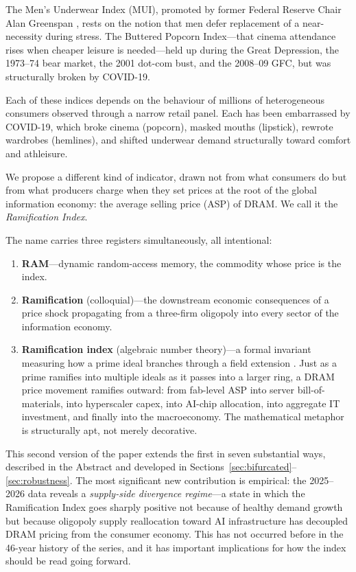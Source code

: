 \documentclass[12pt]{article}
\theoremstyle{definition}
\begin{document}
The Men's Underwear Index (MUI), promoted by former Federal Reserve Chair Alan Greenspan \cite{Greenspan2007,Krulwich2008}, rests on the notion that men defer replacement of a near-necessity during stress. The Buttered Popcorn Index---that cinema attendance rises when cheaper leisure is needed---held up during the Great Depression, the 1973--74 bear market, the 2001 dot-com bust, and the 2008--09 GFC, but was structurally broken by COVID-19.

Each of these indices depends on the behaviour of millions of heterogeneous consumers observed through a narrow retail panel. Each has been embarrassed by COVID-19, which broke cinema (popcorn), masked mouths (lipstick), rewrote wardrobes (hemlines), and shifted underwear demand structurally toward comfort and athleisure.

We propose a different kind of indicator, drawn not from what consumers do but from what producers charge when they set prices at the root of the global information economy: the average selling price (ASP) of DRAM. We call it the \emph{Ramification Index}.

The name carries three registers simultaneously, all intentional:
\begin{enumerate}[itemsep=2pt]
\item \textbf{RAM}---dynamic random-access memory, the commodity whose price is the index.
\item \textbf{Ramification} (colloquial)---the downstream economic consequences of a price shock propagating from a three-firm oligopoly into every sector of the information economy.
\item \textbf{Ramification index} (algebraic number theory)---a formal invariant measuring how a prime ideal branches through a field extension \cite{Neukirch1999}. Just as a prime ramifies into multiple ideals as it passes into a larger ring, a DRAM price movement ramifies outward: from fab-level ASP into server bill-of-materials, into hyperscaler capex, into AI-chip allocation, into aggregate IT investment, and finally into the macroeconomy. The mathematical metaphor is structurally apt, not merely decorative.
\end{enumerate}

This second version of the paper extends the first in seven substantial ways, described in the Abstract and developed in Sections~\ref{sec:bifurcated}--\ref{sec:robustness}. The most significant new contribution is empirical: the 2025--2026 data reveals a \emph{supply-side divergence regime}---a state in which the Ramification Index goes sharply positive not because of healthy demand growth but because oligopoly supply reallocation toward AI infrastructure has decoupled DRAM pricing from the consumer economy. This has not occurred before in the 46-year history of the series, and it has important implications for how the index should be read going forward.
\end{document}
